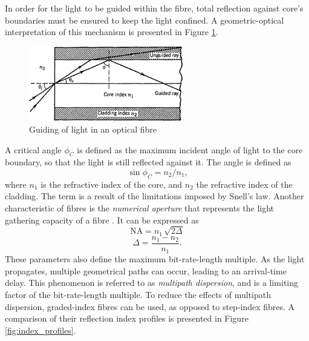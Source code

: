 \documentclass{standalone}
\begin{document}
In order for the light to be guided within the fibre, total reflection against core's boundaries must be ensured to keep the light confined. A geometric-optical interpretation of this mechanism is presented in Figure \ref{fig:critical_angle}.
\begin{figure}[h]
	\centering
	\includegraphics[width=0.6\textwidth]{critical_angle.png}
	\caption{Guiding of light in an optical fibre \cite{agrawal}}
	\label{fig:critical_angle}
\end{figure}
A critical angle $\phi_C$ is defined as the maximum incident angle of light to the core boundary, so that the light is still reflected against it. The angle is defined as
\begin{equation}
\sin \phi_C = n_2/n_1 \textrm{,}
\end{equation}
where $n_1$ is the refractive index of the core, and $n_2$ the refractive index of the cladding. The term is a result of the limitations imposed by Snell's law. Another characteristic of fibres is the \textit{numerical aperture} that represents the light gathering capacity of a fibre \cite{agrawal2005lightwave}. It can be expressed as 
\begin{equation}
\textrm{NA} = n_1 \, \sqrt{2 \varDelta}
\end{equation}
\begin{equation}
\varDelta = \frac{n_1 - n_2}{n_1} \textrm{.}
\end{equation}
These parameters also define the maximum bit-rate-length multiple. As the light propagates, multiple geometrical paths can occur, leading to an arrival-time delay. This phenomenon is referred to as \textit{multipath dispersion}, and is a limiting factor of the bit-rate-length multiple. To reduce the effects of multipath dispersion, graded-index fibres can be used, as opposed to step-index fibres. A comparison of their reflection index profiles is presented in Figure \ref{fig:index_profiles}.
\end{document}
